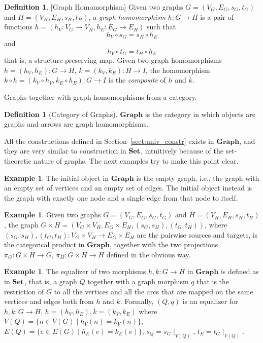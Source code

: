 \documentclass[a4paper, twoside,openright]{report}
\theoremstyle{plain}
\theoremstyle{definition}
\newtheorem{definition}[theorem]{Definition}
\newtheorem{example}[theorem]{Example}
\begin{document}
\begin{definition}\label{def:graph_hom}[Graph Homomorphism]
    Given two graphs $G=(V_G, E_G, s_G, t_G)$ and $H=(V_H, E_H, s_H, t_H)$, a \emph{graph homomorphism} $h: G \rightarrow H$ is a pair of functions $h = (h_V: V_G \rightarrow V_H, h_E: E_G \rightarrow E_H)$ such that
    \[
        h_V \circ s_G = s_H \circ h_E
    \]
    and
    \[
        h_V \circ t_G = t_H \circ h_E
    \]
    that is, a structure preserving map.
    Given two graph homomorphisms $h = (h_V, h_E): G \rightarrow H$, $k = (k_V, k_E): H \rightarrow I$, the homomorphism $ k \circ h = (k_V \circ h_V, k_E \circ h_E): G \rightarrow I$ is the \emph{composite} of $h$ and $k$.
\end{definition}

Graphs together with graph homomorphisms from a category.

\begin{definition}[Category of Graphs]\label{def:cat_of_graph}
    $\mathbf{Graph}$ is the category in which objects are graphs and arrows are graph homomorphisms.
\end{definition}

All the constructions defined in Section~\ref{sect:univ_constr} exists in $\mathbf{Graph}$, and they are very similar to construction in $\mathbf{Set}$, intuitively because of the set-theoretic nature of graphs. The next examples try to make this point clear.

\begin{example}\label{ex:in_term_in_graph}
    The initial object in $\mathbf{Graph}$ is the empty graph, i.e., the graph with an empty set of vertices and an empty set of edges. The initial object instead is the graph with exactly one node and a single edge from that node to itself.
\end{example}

\begin{example}
    Given two graphs $G = (V_G, E_G, s_G, t_G)$ and $H=(V_H, E_H, s_H, t_H)$, the graph $G \times H = (V_G\times V_H, E_G \times E_H, (s_G, s_H), (t_G, t_H))$, where $(s_G, s_H), (t_G, t_H):V_G\times V_H \rightarrow E_G \times E_H$ are the pairwise sources and targets, is the categorical product in $\mathbf{Graph}$, together with the two projections $\pi_G: G \times H \rightarrow G$, $\pi_H : G \times H \rightarrow H$ defined in the obvious way.
\end{example}

\begin{example}
    The equalizer of two morphisms $h, k: G \rightarrow H$ in $\mathbf{Graph}$ is defined as in $\mathbf{Set}$, that is,  a graph $Q$ together with a graph morphism $q$ that is the restriction of $G$ to all the vertices and all the arcs that are mapped on the same vertices and edges both from $h$ and $k$. Formally, $(Q, q)$ is an equalizer for $h, k: G \rightarrow H$, $h = (h_V, h_E), k = (k_V, k_E)$ where $V(Q) = \{ n \in V(G) \mid h_V(n) = k_V(n)\}$, $E(Q) = \{ e \in E(G) \mid h_E(e) = k_E(e)\}$, $s_Q = s_G \mid_{V(Q)}$, $t_E = t_G \mid_{V(Q)}$.
\end{example}
\end{document}
